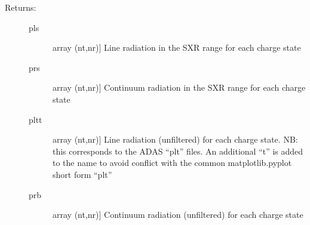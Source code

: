 \documentclass[letterpaper,10pt,english]{sphinxmanual}
\begin{document}
\begin{fulllineitems}
\begin{description}
\begin{description}
\end{description}

\item[{Returns:}] \leavevmode\begin{description}
\item[{pls}] \leavevmode{[}array (nt,nr){]}
Line radiation in the SXR range for each charge state

\item[{prs}] \leavevmode{[}array (nt,nr){]}
Continuum radiation in the SXR range for each charge state

\item[{pltt}] \leavevmode{[}array (nt,nr){]}
Line radiation (unfiltered) for each charge state.
NB: this corresponds to the ADAS “plt” files. An additional “t” is added to the name to avoid
conflict with the common matplotlib.pyplot short form “plt”

\item[{prb}] \leavevmode{[}array (nt,nr){]}
Continuum radiation (unfiltered) for each charge state

\end{description}

\end{description}

\end{fulllineitems}

\end{document}
